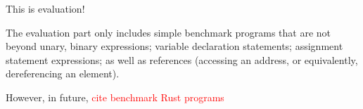 This is evaluation!

The evaluation part only includes simple
benchmark programs that are not beyond
unary, binary expressions; variable declaration 
statements; assignment statement expressions;
as well as references (accessing an address,
or equivalently, dereferencing an element).

However, in future, \textcolor{red}{cite benchmark Rust programs}
